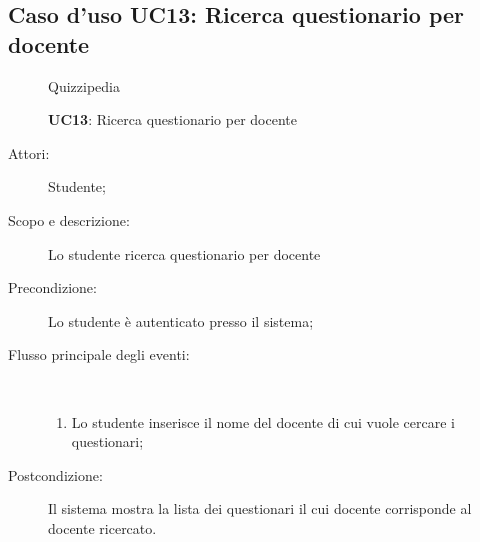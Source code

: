 \subsection{Caso d'uso UC13: Ricerca questionario per docente}
	\begin{figure}[H]
		\centering
		\begin{resizedtikzpicture}{\textwidth}
		\begin{umlsystem}[x=0, fill=lightgray!20]{Quizzipedia}
		\end{umlsystem}
		\end{resizedtikzpicture}
		\caption{\textbf{UC13}: Ricerca questionario per docente}
		\label{UC13}
	\end{figure}
\begin{description}
\item[Attori:] Studente;
\item[Scopo e descrizione:] Lo studente ricerca questionario per docente
      \item[Precondizione:] Lo studente è autenticato presso il sistema;

        \item[Flusso principale degli eventi:] \ 
 \begin{enumerate}
          \item Lo studente inserisce il nome del docente di cui vuole cercare i questionari;

      \end{enumerate}
    \item[Postcondizione:] Il sistema mostra la lista dei questionari il cui docente corrisponde al docente ricercato.
  \end{description}
\hypertarget{UC14}{}
